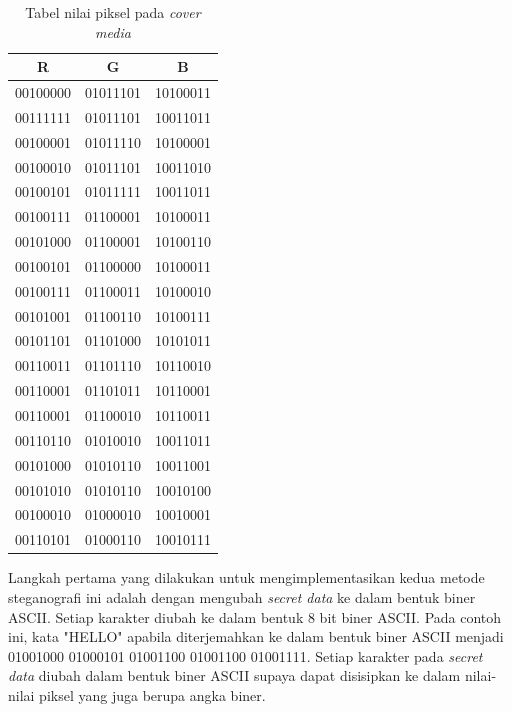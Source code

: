 \documentclass[a4paper,twoside]{article}
\begin{document}
\begin{enumerate}
		\begin{table}[!htbp]
		\centering
		\caption{Tabel nilai piksel pada \textit{cover media}} 
		\label{tabelNilaiPiksel}
		\begin{tabular}{| c | c | c |}
		\hline
		R & G & B\\
		\hline
		00100000 & 01011101 & 10100011\\
		\hline
		00111111 & 01011101 & 10011011\\
		\hline
		00100001 & 01011110 & 10100001\\
		\hline
		00100010 & 01011101 & 10011010\\
		\hline
		00100101 & 01011111 & 10011011\\
		\hline
		00100111 & 01100001 & 10100011\\
		\hline
		00101000 & 01100001 & 10100110\\
		\hline
		00100101 & 01100000 & 10100011\\
		\hline
		00100111 & 01100011 & 10100010\\
		\hline
		00101001 & 01100110 & 10100111\\
		\hline
		00101101 & 01101000 & 10101011\\
		\hline
		00110011 & 01101110 & 10110010\\
		\hline
		00110001 & 01101011 & 10110001\\
		\hline
		00110001 & 01100010 & 10110011\\
		\hline
		00110110 & 01010010 & 10011011\\
		\hline
		00101000 & 01010110 & 10011001\\
		\hline
		00101010 & 01010110 & 10010100\\
		\hline
		00100010 & 01000010 & 10010001\\
		\hline
		00110101 & 01000110 & 10010111\\
		\hline
		\end{tabular}
		\end{table} 	
			
		Langkah pertama yang dilakukan untuk mengimplementasikan kedua metode steganografi ini adalah dengan mengubah \textit{secret data} ke dalam bentuk biner ASCII. Setiap karakter diubah ke dalam bentuk 8 bit biner ASCII. Pada contoh ini, kata "HELLO" apabila diterjemahkan ke dalam bentuk biner ASCII menjadi 01001000 01000101 01001100 01001100 01001111. Setiap karakter pada \textit{secret data} diubah dalam bentuk biner ASCII supaya dapat disisipkan ke dalam nilai-nilai piksel yang juga berupa angka biner.\\
		

\end{enumerate}
\end{document}
